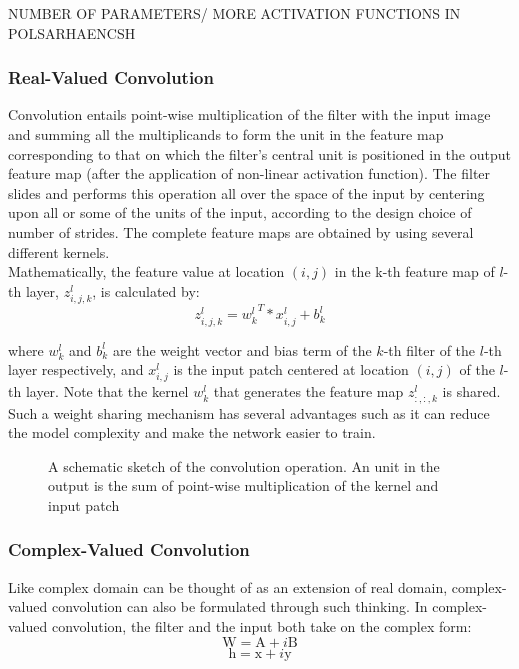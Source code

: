  NUMBER OF PARAMETERS/ MORE ACTIVATION FUNCTIONS IN POLSARHAENCSH
 
 \subsubsection{Real-Valued Convolution}
 Convolution entails point-wise multiplication of the filter with the input image and summing all the multiplicands to form the unit in the feature map corresponding to that on which the filter's central unit is positioned in the output feature map (after the application of non-linear activation function). The filter slides and performs this operation all over the space of the input by centering upon all or some of the units of the input, according to the design choice of number of strides. The complete feature maps are obtained by using several different kernels. \\
 
 Mathematically, the feature value at location $(i, j)$ in the k-th feature map of $l$-th layer, $z_{i,j,k}^l$, is calculated by:
 \begin{equation}
 z_{i,j,k}^l= {w_{k}^l}^T*x^l_{i,j} + b^l_k
 \end{equation}
 
 
 where $w_k^{l}$ and $b_k^{l}$ are the weight vector and bias term of the $k$-th filter of the $l$-th layer respectively, and
 $x^l_{i,j}$ is the input patch centered at location $(i, j)$ of the $l$-th layer. Note that the kernel $w_k^{l}$ that generates
 the feature map $z^l_{:,:,k}$ is shared. Such a weight sharing mechanism has several advantages such as it can reduce the model complexity and make the network easier to train\cite{recent_advances}. 
 
\begin{figure}[htb]
	\centering
	\epsfxsize=6cm
	{}
	\caption{A schematic sketch of the convolution operation. An unit in the output is the sum of point-wise multiplication of the kernel and input patch \cite{bloggg}}
	\label{fig:conv}
\end{figure}
 

\subsubsection{Complex-Valued Convolution}
Like complex domain can be thought of as an extension of real domain, complex-valued convolution can also be formulated through such thinking. In complex-valued convolution, the filter and the input both take on the complex form:
 \begin{equation}
\mathrm{W} = \mathrm{A}+i\mathrm{B}
\label{eqCfilter}
\end{equation}
 \begin{equation}
\mathrm{h} = \mathrm{x}+i\mathrm{y}
\label{eqCinput}
\end{equation}
 
